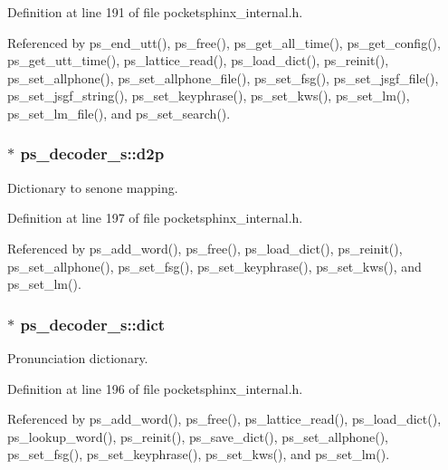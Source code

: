 Definition at line 191 of file pocketsphinx\+\_\+internal.\+h.



Referenced by ps\+\_\+end\+\_\+utt(), ps\+\_\+free(), ps\+\_\+get\+\_\+all\+\_\+time(), ps\+\_\+get\+\_\+config(), ps\+\_\+get\+\_\+utt\+\_\+time(), ps\+\_\+lattice\+\_\+read(), ps\+\_\+load\+\_\+dict(), ps\+\_\+reinit(), ps\+\_\+set\+\_\+allphone(), ps\+\_\+set\+\_\+allphone\+\_\+file(), ps\+\_\+set\+\_\+fsg(), ps\+\_\+set\+\_\+jsgf\+\_\+file(), ps\+\_\+set\+\_\+jsgf\+\_\+string(), ps\+\_\+set\+\_\+keyphrase(), ps\+\_\+set\+\_\+kws(), ps\+\_\+set\+\_\+lm(), ps\+\_\+set\+\_\+lm\+\_\+file(), and ps\+\_\+set\+\_\+search().

\subsubsection[{d2p}]{$\ast$ ps\+\_\+decoder\+\_\+s\+::d2p}\label{structps__decoder__s_ae6515cbc261686f3f3bbd95719f79793}


Dictionary to senone mapping. 



Definition at line 197 of file pocketsphinx\+\_\+internal.\+h.



Referenced by ps\+\_\+add\+\_\+word(), ps\+\_\+free(), ps\+\_\+load\+\_\+dict(), ps\+\_\+reinit(), ps\+\_\+set\+\_\+allphone(), ps\+\_\+set\+\_\+fsg(), ps\+\_\+set\+\_\+keyphrase(), ps\+\_\+set\+\_\+kws(), and ps\+\_\+set\+\_\+lm().

\subsubsection[{dict}]{$\ast$ ps\+\_\+decoder\+\_\+s\+::dict}\label{structps__decoder__s_aef6228c17907cc1d0cef835b238b5d91}


Pronunciation dictionary. 



Definition at line 196 of file pocketsphinx\+\_\+internal.\+h.



Referenced by ps\+\_\+add\+\_\+word(), ps\+\_\+free(), ps\+\_\+lattice\+\_\+read(), ps\+\_\+load\+\_\+dict(), ps\+\_\+lookup\+\_\+word(), ps\+\_\+reinit(), ps\+\_\+save\+\_\+dict(), ps\+\_\+set\+\_\+allphone(), ps\+\_\+set\+\_\+fsg(), ps\+\_\+set\+\_\+keyphrase(), ps\+\_\+set\+\_\+kws(), and ps\+\_\+set\+\_\+lm().

